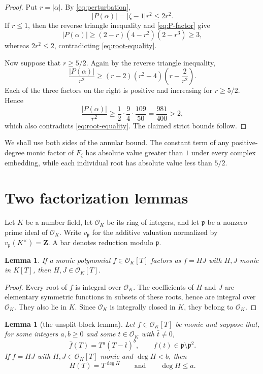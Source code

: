 \documentclass[11pt]{article}
\newtheorem{lemma}[theorem]{Lemma}
\newcommand{\Z}{\mathbf Z}
\newcommand{\OK}{\mathcal O_K}
\begin{document}
\begin{proof}
Put $r=|\alpha|$.  By \eqref{eq:perturbation},
\begin{equation}\label{eq:root-equality}
 |P(\alpha)|=|\zeta-1|r^2\leq2r^2.
\end{equation}
If $r\leq1$, then the reverse triangle inequality and
\eqref{eq:P-factor} give
\[
 |P(\alpha)|
 \geq(2-r)(4-r^2)(2-r^3)
 \geq3,
\]
whereas $2r^2\leq2$, contradicting \eqref{eq:root-equality}.

Now suppose that $r\geq5/2$.  Again by the reverse triangle inequality,
\[
 \frac{|P(\alpha)|}{r^2}
 \geq(r-2)(r^2-4)\left(r-\frac{2}{r^2}\right).
\]
Each of the three factors on the right is positive and increasing for
$r\geq5/2$.  Hence
\[
 \frac{|P(\alpha)|}{r^2}
 \geq\frac12\cdot\frac94\cdot\frac{109}{50}
 =\frac{981}{400}>2,
\]
which also contradicts \eqref{eq:root-equality}.  The claimed strict
bounds follow.
\end{proof}

We shall use both sides of the annular bound.  The constant term of any
positive-degree monic factor of $F_\zeta$ has absolute value greater than
$1$ under every complex embedding, while each individual root has
absolute value less than $5/2$.

\section{Two factorization lemmas}

Let $K$ be a number field, let $\OK$ be its ring of integers, and let
$\mathfrak p$ be a nonzero prime ideal of $\OK$.  Write
$v_{\mathfrak p}$ for the additive valuation normalized by
$v_{\mathfrak p}(K^\times)=\Z$.  A bar denotes reduction modulo
$\mathfrak p$.

\begin{lemma}\label{lem:integral-factors}
If a monic polynomial $f\in\OK[T]$ factors as $f=HJ$ with $H,J$ monic
in $K[T]$, then $H,J\in\OK[T]$.
\end{lemma}

\begin{proof}
Every root of $f$ is integral over $\OK$.  The coefficients of $H$ and
$J$ are elementary symmetric functions in subsets of these roots, hence
are integral over $\OK$.  They also lie in $K$.  Since $\OK$ is
integrally closed in $K$, they belong to $\OK$.
\end{proof}

\begin{lemma}[the unsplit-block lemma]\label{lem:block}
Let $f\in\OK[T]$ be monic and suppose that, for some integers $a,b\geq0$
and some $t\in\OK$ with $\bar t\neq0$,
\[
 \bar f(T)=T^a(T-\bar t)^b,
 \qquad
 f(t)\in\mathfrak p\setminus\mathfrak p^2.
\]
If $f=HJ$ with $H,J\in\OK[T]$ monic and $\deg H<b$, then
\[
 \bar H(T)=T^{\deg H}
 \qquad\text{and}\qquad
 \deg H\leq a.
\]
\end{lemma}
\end{document}

